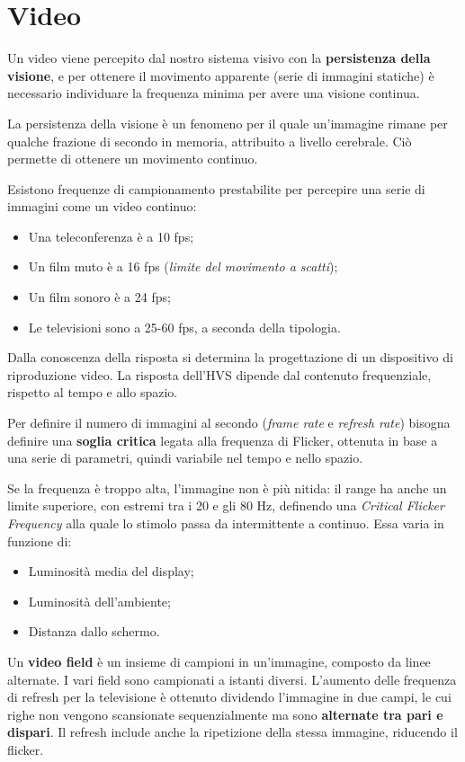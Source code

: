 \section{Video}
Un video viene percepito dal nostro sistema visivo con la \textbf{persistenza della visione}, e per ottenere il movimento apparente (serie di immagini statiche) è necessario individuare la frequenza minima per avere una visione continua. 

La persistenza della visione è un fenomeno per il quale un'immagine rimane per qualche frazione di secondo in memoria, attribuito a livello cerebrale. Ciò permette di ottenere un movimento continuo. 

Esistono frequenze di campionamento prestabilite per percepire una serie di immagini come un video continuo:
\begin{itemize}
	\item Una teleconferenza è a 10 fps;
	\item Un film muto è a 16 fps (\textit{limite del movimento a scatti});
	\item Un film sonoro è a 24 fps;
	\item Le televisioni sono a 25-60 fps, a seconda della tipologia.
\end{itemize}

Dalla conoscenza della risposta si determina la progettazione di un dispositivo di riproduzione video. La risposta dell'HVS dipende dal contenuto frequenziale, rispetto al tempo e allo spazio.

Per definire il numero di immagini al secondo (\textit{frame rate} e \textit{refresh rate}) bisogna definire una \textbf{soglia critica} legata alla frequenza di Flicker, ottenuta in base a una serie di parametri, quindi variabile nel tempo e nello spazio.

Se la frequenza è troppo alta, l'immagine non è più nitida: il range ha anche un limite superiore, con estremi tra i 20 e gli 80 Hz, definendo una \textit{Critical Flicker Frequency} alla quale lo stimolo passa da intermittente a continuo. Essa varia in funzione di:
\begin{itemize}
	\item Luminosità media del display;
	\item Luminosità dell'ambiente;
	\item Distanza dallo schermo.
\end{itemize}

Un \textbf{video field} è un insieme di campioni in un'immagine, composto da linee alternate. I vari field sono campionati a istanti diversi. L'aumento delle frequenza di refresh per la televisione è ottenuto dividendo l'immagine in due campi, le cui righe non vengono scansionate sequenzialmente ma sono \textbf{alternate tra pari e dispari}. Il refresh include anche la ripetizione della stessa immagine, riducendo il flicker.

